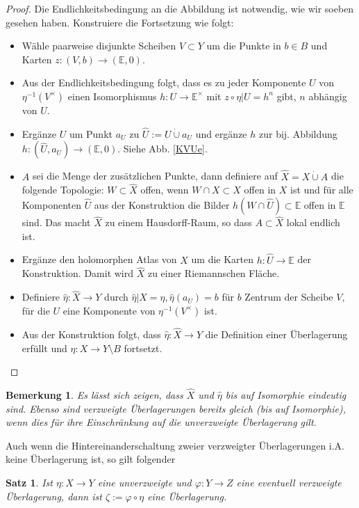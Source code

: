 \documentclass[12pt,a4paper]{article}
\theoremstyle{plain}
\newtheorem{Satz}[Theorem]{Satz}
\newtheorem{Bemerkung}[Theorem]{Bemerkung}
\newcommand{\cupdot}{\mathbin{\dot{\cup}}}
\numberwithin{equation}{section}
\begin{document}
\begin{proof}
Die Endlichkeitsbedingung an die Abbildung ist notwendig, wie wir soeben gesehen haben. Konstruiere die Fortsetzung wie folgt:
\begin{itemize}
\item Wähle paarweise disjunkte Scheiben $V\subset Y$ um die Punkte in $b\in B$ und Karten $z:(V,b)\rightarrow (\mathbb{E},0)$.
\item Aus der Endlichkeitsbedingung folgt, dass es zu jeder Komponente $U$ von $\eta^{-1}(V^\times)$ einen Isomorphismus $h: U\rightarrow \mathbb{E}^\times$ mit $z\circ \eta|U = h^n$ gibt, $n$ abhängig von $U$.
\item Ergänze $U$ um Punkt $a_U$ zu $\hat{U}:=U\cupdot a_U$ und ergänze $h$ zur bij. Abbildung $h: (\hat{U},a_U) \rightarrow (\mathbb{E},0)$. Siehe Abb. \ref{KVUe}.
\item $A$ sei die Menge der zusätzlichen Punkte, dann definiere auf $\hat{X} = X \cupdot A$ die folgende Topologie: $W\subset \hat{X}$ offen, wenn $W\cap X \subset X$ offen in $X$ ist und für alle Komponenten $\hat{U}$ aus der Konstruktion die Bilder $h(W\cap \hat{U})\subset \mathbb{E}$ offen in $\mathbb{E}$ sind. Das macht $\hat{X}$ zu einem Hausdorff-Raum, so dass $A\subset \hat{X}$ lokal endlich ist.
\item Ergänze den holomorphen Atlas von $X$ um die Karten $h:\hat{U}\rightarrow \mathbb{E}$ der Konstruktion. Damit wird $\hat{X}$ zu einer Riemannschen Fläche.
\item Definiere $\hat{\eta}: \hat{X}\rightarrow Y$ durch $\hat{\eta}|X = \eta, \hat{\eta}(a_U)=b$ für $b$ Zentrum der Scheibe $V$, für die $U$ eine Komponente von $\eta^{-1}(V^\times)$ ist.
\item Aus der Konstruktion folgt, dass $\hat{\eta}:\hat{X}\rightarrow Y$ die Definition einer Überlagerung erfüllt und $\eta: X\rightarrow Y\setminus B$ fortsetzt.
\end{itemize}
\end{proof}
\begin{Bemerkung}
Es lässt sich zeigen, dass $\hat{X}$ und $\hat{\eta}$ bis auf Isomorphie eindeutig sind. Ebenso sind verzweigte Überlagerungen bereits gleich (bis auf Isomorphie), wenn dies für ihre Einschränkung auf die unverzweigte Überlagerung gilt.
\end{Bemerkung}
Auch wenn die Hintereinanderschaltung zweier verzweigter Überlagerungen i.A. keine Über\-la\-ge\-rung ist, so gilt folgender
\begin{Satz} Ist $\eta: X\rightarrow Y$ eine unverzweigte und $\varphi: Y\rightarrow Z$ eine eventuell verzweigte Überlagerung, dann ist $\zeta:=\varphi\circ \eta$ eine Überlagerung.
\end{Satz}
\end{document}
